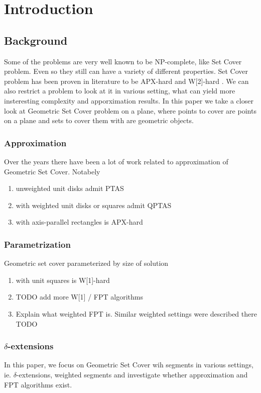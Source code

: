 \chapter{Introduction}

\section{Background}
Some of the problems are very well known to be NP-complete, like
Set Cover problem. Even so they still can have a variety
of different properties. Set Cover problem has been proven
in literature to be APX-hard and W[2]-hard \cite{platypus_book}.
We can also restrict a problem to look at it in various setting,
what can yield more insteresting complexity and apporximation results.
In this paper we take a closer look at Geometric Set Cover problem
on a plane, where points to cover are points on a plane
and sets to cover them with are geometric objects.

\subsection{Approximation}
Over the years there have been a lot of work related to approximation
of Geometric Set Cover. Notabely 
	\begin{enumerate}
		\item unweighted unit disks admit PTAS \cite{unit_disks}
		\item with weighted unit disks or squares admit QPTAS \cite{voronoi_true}
		\item with axis-parallel rectangles is APX-hard \cite{settling_apx_hardness}
	\end{enumerate}
\subsection{Parametrization}
Geometric set cover parameterized by size of solution
	\begin{enumerate}
		\item with unit squares is W[1]-hard \cite{marx05}
		\item TODO add more W[1] / FPT algorithms
\item Explain what weighted FPT is. Similar weighted settings
were described there TODO
	\end{enumerate}

\subsection{$\delta$-extensions}
In this paper, we focus on Geometric Set Cover wih segments
in various settings, ie. $\delta$-extensions, weighted segments
and investigate whether approximation and FPT algorithms exist.

